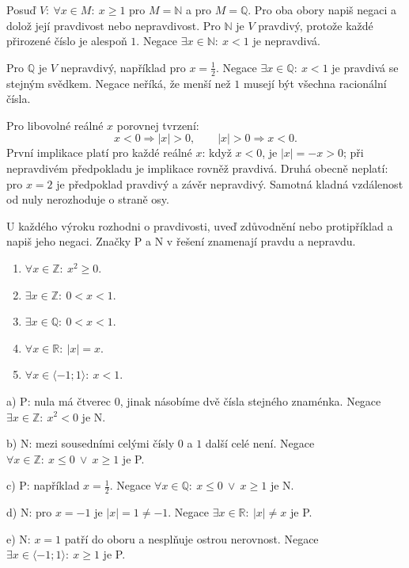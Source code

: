 \documentclass[11pt,a4paper]{article}
\begin{document}
\begin{prikladReseniBox}[title={Příklad 2},breakable=false]
Posuď $V:\ \forall x\in M:\ x\ge1$ pro $M=\mathbb N$ a pro $M=\mathbb Q$.
Pro oba obory napiš negaci a dolož její pravdivost nebo nepravdivost.
\tcblower
Pro $\mathbb N$ je $V$ pravdivý, protože každé přirozené číslo je alespoň $1$.
Negace $\exists x\in\mathbb N:\ x<1$ je nepravdivá.

Pro $\mathbb Q$ je $V$ nepravdivý, například pro $x=\frac12$.
Negace $\exists x\in\mathbb Q:\ x<1$ je pravdivá se stejným svědkem.
Negace neříká, že menší než $1$ musejí být všechna racionální čísla.
\end{prikladReseniBox}

\begin{prikladReseniBox}[title={Příklad 3},breakable=false]
Pro libovolné reálné $x$ porovnej tvrzení:
\[
x<0\Rightarrow |x|>0,\qquad |x|>0\Rightarrow x<0.
\]
\tcblower
První implikace platí pro každé reálné $x$: když $x<0$, je $|x|=-x>0$;
při nepravdivém předpokladu je implikace rovněž pravdivá.
Druhá obecně neplatí: pro $x=2$ je předpoklad pravdivý a závěr nepravdivý.
Samotná kladná vzdálenost od nuly nerozhoduje o straně osy.
\end{prikladReseniBox}

\begin{zadaniReseniBox}[title={Samostatná práce 1},breakable=false]
U každého výroku rozhodni o pravdivosti, uveď zdůvodnění nebo protipříklad
a napiš jeho negaci. Značky P a N v řešení znamenají pravdu a nepravdu.
\begin{enumerate}[label=\alph*)]
\item $\forall x\in\mathbb Z:\ x^2\ge0$.
\item $\exists x\in\mathbb Z:\ 0<x<1$.
\item $\exists x\in\mathbb Q:\ 0<x<1$.
\item $\forall x\in\mathbb R:\ |x|=x$.
\item $\forall x\in\langle-1;1\rangle:\ x<1$.
\end{enumerate}
\tcblower
a) P: nula má čtverec $0$, jinak násobíme dvě čísla stejného znaménka.
Negace $\exists x\in\mathbb Z:\ x^2<0$ je N.

b) N: mezi sousedními celými čísly $0$ a $1$ další celé není.
Negace $\forall x\in\mathbb Z:\ x\le0\ \lor\ x\ge1$ je P.

c) P: například $x=\frac12$. Negace
$\forall x\in\mathbb Q:\ x\le0\ \lor\ x\ge1$ je N.

d) N: pro $x=-1$ je $|x|=1\ne-1$.
Negace $\exists x\in\mathbb R:\ |x|\ne x$ je P.

e) N: $x=1$ patří do oboru a nesplňuje ostrou nerovnost.
Negace $\exists x\in\langle-1;1\rangle:\ x\ge1$ je P.
\end{zadaniReseniBox}
\end{document}
